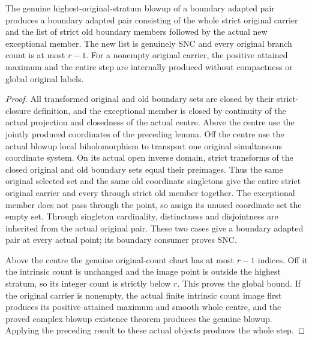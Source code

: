 \begin{theorem}
\label{hir:general-nc-boundary-transform-original-count-step}
\leanok
The genuine highest-original-stratum blowup of a boundary adapted pair
produces a boundary adapted pair consisting of the whole strict
original carrier and the list of strict old boundary members followed
by the actual new exceptional member. The new list is genuinely SNC
and every original branch count is at most $r-1$. For a nonempty
original carrier, the positive attained maximum and the entire step
are internally produced without compactness or global original labels.
\end{theorem}
\begin{proof}
All transformed original and old boundary sets are closed by their
strict-closure definition, and the exceptional member is closed by
continuity of the actual projection and closedness of the actual
centre. Above the centre use the jointly produced coordinates of the
preceding lemma. Off the centre use the actual blowup local
biholomorphism to transport one original simultaneous coordinate
system. On its actual open inverse domain, strict transforms of the
closed original and old boundary sets equal their preimages. Thus the
same original selected set and the same old coordinate singletons
give the entire strict original carrier and every through strict old
member together. The exceptional member does not pass through the
point, so assign its unused coordinate set the empty set. Through
singleton cardinality, distinctness and disjointness are inherited
from the actual original pair. These two cases give a boundary adapted
pair at every actual point; its boundary consumer proves SNC.

Above the centre the genuine original-count chart has at most $r-1$
indices. Off it the intrinsic count is unchanged and the image point
is outside the highest stratum, so its integer count is strictly
below $r$. This proves the global bound. If the original carrier is
nonempty, the actual finite intrinsic count image first produces its
positive attained maximum and smooth whole centre, and the proved
complex blowup existence theorem produces the genuine blowup. Applying
the preceding result to these actual objects produces the whole step.
\end{proof}

